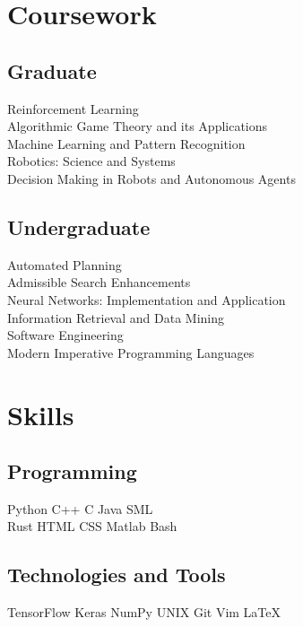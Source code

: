 \documentclass[]{deedy-resume}
\begin{document}
\begin{minipage}[t]{0.33\textwidth}

\section{Coursework}
\subsection{Graduate}
Reinforcement Learning \\
Algorithmic Game Theory and its Applications \\
Machine Learning and Pattern Recognition \\
Robotics: Science and Systems \\
Decision Making in Robots and Autonomous Agents \\
\sectionsep

\subsection{Undergraduate}
Automated Planning \\
Admissible Search Enhancements \\
Neural Networks: Implementation and Application \\
Information Retrieval and Data Mining \\
Software Engineering \\
Modern Imperative Programming Languages \\
\sectionsep


\section{Skills}
\subsection{Programming}
Python \textbullet{} C++ \textbullet{} C \textbullet{} Java \textbullet{} SML \\
\sectionsep
{}
Rust \textbullet{} HTML \textbullet{} CSS \textbullet{} Matlab \textbullet{} Bash \\
\sectionsep

\subsection{Technologies and Tools}
TensorFlow \textbullet{} Keras \textbullet{} NumPy \textbullet{} UNIX \textbullet{} Git \textbullet{} Vim \textbullet{} \LaTeX

%
%

\end{minipage} 
\end{document}
